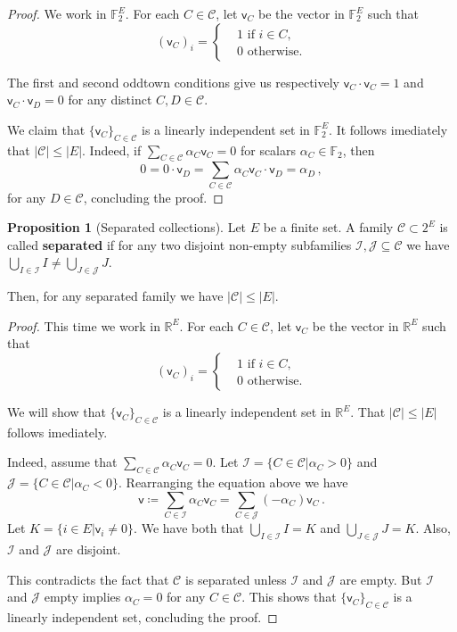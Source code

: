 \documentclass[12pt]{amsart}
\theoremstyle{definition}
\newtheorem{prop}[thm]{Proposition}
\newcommand{\R}{\mathbb{R}}
\newcommand{\F}{\mathbb{F}}
\newcommand{\CC}{\mathcal C}
\newcommand{\JJ}{\mathcal J}
\newcommand{\II}{\mathcal I}
\newcommand{\vv}{\mathsf{v}}
\begin{document}
\begin{proof}
We work in $\F_2^E$.
For each $C \in \CC$, let $\vv_C$ be the vector in $\F_2^E$ such that 
$$ (\vv_C)_i =\begin{cases*}
      & 1 \text{ if $i \in C$,}\\
      & 0 \text{ otherwise.}
    \end{cases*} $$

The first and second oddtown conditions give us respectively $\vv_C \cdot \vv_C = 1$ and $\vv_C \cdot \vv_D = 0 $ for any distinct $C, D \in \CC$.

We claim that $\{\vv_C\}_{C \in \CC}$ is a linearly independent set in $\F_2^E$.
It follows imediately that $|\CC| \leq |E|$.
Indeed, if $\sum_{C \in \CC} \alpha_C \vv_C = 0$ for scalars $\alpha_C \in \F_2$, then
$$ 0 = 0 \cdot \vv_D = \sum_{C \in \CC} \alpha_C \vv_C\cdot \vv_D = \alpha_D\, ,$$
for any $D \in \CC$, concluding the proof.
\end{proof}


\begin{prop}[Separated collections]
Let $E$ be a finite set.
A family $\CC \subset 2^E $ is called \textbf{separated} if for any two disjoint non-empty subfamilies $\II, \JJ \subseteq \CC$ we have $\bigcup_{I\in\II} I \neq \bigcup_{J\in\JJ} J$.

Then, for any separated family we have $|\CC| \leq |E|$.
\end{prop}


\begin{proof}
This time we work in $\R^E$.
For each $C \in \CC$, let $\vv_C$ be the vector in $\R^E$ such that 
$$ (\vv_C)_i =\begin{cases*}
      & 1 \text{ if $i \in C$,}\\
      & 0 \text{ otherwise.}
    \end{cases*} $$


We will show that $ \{ \vv_C\}_{C\in \CC}$ is a linearly independent set in $\R^E$.
That $|\CC| \leq |E|$ follows imediately.

Indeed, assume that $\sum_{C \in \CC} \alpha_C \vv_C = 0$.
Let $\II = \{C \in \CC | \alpha_C > 0\}$ and $\JJ = \{C \in \CC | \alpha_C < 0\}$.
Rearranging the equation above we have
$$\vv \coloneqq \sum_{C \in \II} \alpha_C \vv_C  = \sum_{C \in \JJ} (- \alpha_C) \vv_C\, .$$
Let $K = \{i \in E| \vv_i \neq 0\}$.
We have both that $\bigcup_{I\in\II} I = K$ and $\bigcup_{J\in\JJ} J = K$.
Also, $\II$ and $\JJ$ are disjoint.

This contradicts the fact that $\CC$ is separated unless $\II$ and $\JJ$ are empty.
But $\II$ and $\JJ$ empty implies $\alpha_C = 0 $ for any $C \in \CC$.
This shows that $ \{ \vv_C\}_{C\in \CC}$ is a linearly independent set, concluding the proof.
\end{proof}
\end{document}
